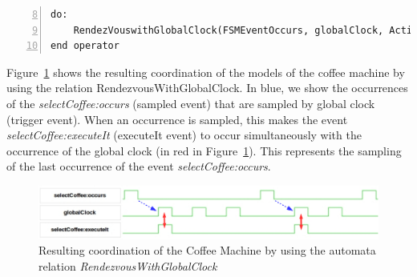 \begin{lstlisting}[language=bcool,
caption={\bcool specification of an operator that illustrates the use of a \moccml library},
label={lst:bcoolrunningexamplellib}, 
basicstyle=\scriptsize\ttfamily, backgroundcolor=\color{LGrey}, numbers=left, firstnumber=8, xleftmargin=2pt]
do: 
	RendezVouswithGlobalClock(FSMEventOccurs, globalClock, ActionExecute)
end operator
\end{lstlisting}

Figure~\ref{fig:libvcd} shows the resulting coordination of the models of the coffee machine by using the relation RendezvousWithGlobalClock. In blue, we show the occurrences of the \emph{selectCoffee:occurs} (sampled event) that are sampled by global clock (trigger event). When an occurrence is sampled, this makes the event \emph{selectCoffee:executeIt} (executeIt event) to occur simultaneously with the occurrence of the global clock (in red in Figure~\ref{fig:libvcd}). This represents the sampling of the last occurrence of the event \emph{selectCoffee:occurs}.   
  
\begin{figure}[h]
	\center
	\includegraphics[width=.9\textwidth]{bcool/figs/libvcd}
	\caption{Resulting coordination of the Coffee Machine by using the automata relation \emph{RendezvousWithGlobalClock}}
	\label{fig:libvcd}
\end{figure}





